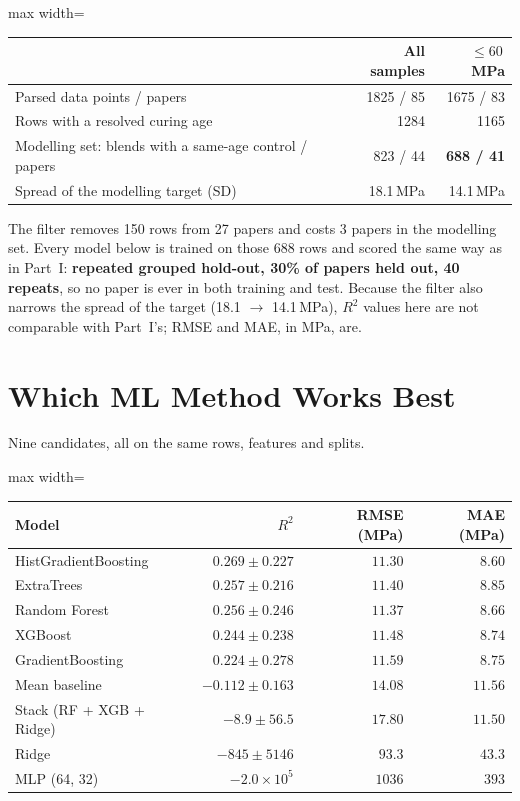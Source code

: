 \documentclass[11pt]{article}
\newcommand{\R}{$R^2$}
\begin{document}
\begin{center}\small
\begin{adjustbox}{max width=\linewidth}
\begin{tabular}{lrr}
\toprule
 & All samples & $\leq60$\,MPa \\
\midrule
Parsed data points / papers & 1825 / 85 & 1675 / 83 \\
Rows with a resolved curing age & 1284 & 1165 \\
Modelling set: blends with a same-age control / papers & 823 / 44 & \textbf{688 / 41} \\
Spread of the modelling target (SD) & 18.1\,MPa & 14.1\,MPa \\
\bottomrule
\end{tabular}
\end{adjustbox}
\end{center}

\noindent The filter removes 150 rows from 27 papers and costs 3 papers in the modelling
set. Every model below is trained on those 688 rows and scored the same way as in
Part~I: \textbf{repeated grouped hold-out, 30\% of papers held out, 40 repeats}, so no
paper is ever in both training and test. Because the filter also narrows the spread of
the target (18.1 $\to$ 14.1\,MPa), \R{} values here are not comparable with Part~I's;
RMSE and MAE, in MPa, are.

\section{Which ML Method Works Best}
\label{sec:rcf-p3-model}
Nine candidates, all on the same rows, features and splits.

\begin{center}\small
\begin{adjustbox}{max width=\linewidth}
\begin{tabular}{lrrr}
\toprule
Model & \R{} & RMSE (MPa) & MAE (MPa) \\
\midrule
\rowcolor{green!12}HistGradientBoosting & $\mathbf{0.269\pm0.227}$ & $\mathbf{11.30}$ & $\mathbf{8.60}$ \\
ExtraTrees & $0.257\pm0.216$ & $11.40$ & $8.85$ \\
Random Forest & $0.256\pm0.246$ & $11.37$ & $8.66$ \\
XGBoost & $0.244\pm0.238$ & $11.48$ & $8.74$ \\
GradientBoosting & $0.224\pm0.278$ & $11.59$ & $8.75$ \\
Mean baseline & $-0.112\pm0.163$ & $14.08$ & $11.56$ \\
Stack (RF + XGB + Ridge) & $-8.9\pm56.5$ & $17.80$ & $11.50$ \\
Ridge & $-845\pm5146$ & $93.3$ & $43.3$ \\
MLP (64, 32) & $-2.0\times10^{5}$ & $1036$ & $393$ \\
\bottomrule
\end{tabular}
\end{adjustbox}
\end{center}
\end{document}
